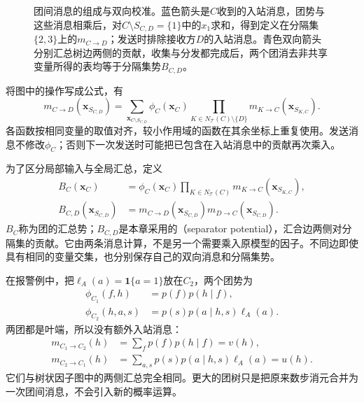 \begin{figure}[htbp]
  \centering
  
  \caption{团间消息的组成与双向校准。蓝色箭头是$C$收到的入站消息，团势与这些消息相乘后，对$C\setminus S_{C,D}=\{1\}$中的$x_1$求和，得到定义在分隔集$\{2,3\}$上的$m_{C\to D}$；发送时排除接收方$D$的入站消息。青色双向箭头分别汇总树边两侧的贡献，收集与分发都完成后，两个团消去非共享变量所得的表均等于分隔集势$B_{C,D}$。}
  \label{fig:pgm-junction-tree-message}
\end{figure}

将图中的操作写成公式，有
\begin{equation}
  m_{C\to D}(\bm{x}_{S_{C,D}})
    =\sum_{\bm{x}_{C\setminus S_{C,D}}}
      \phi_C(\bm{x}_C)
      \prod_{K\in N_{\mathcal{T}}(C)\setminus\{D\}}
        m_{K\to C}(\bm{x}_{S_{K,C}}).
  \label{eq:pgm-junction-tree-clique-message}
\end{equation}
各函数按相同变量的取值对齐，较小作用域的函数在其余坐标上重复使用。发送消息不修改$\phi_C$；否则下一次发送时可能把已包含在入站消息中的贡献再次乘入。

为了区分局部输入与全局汇总，定义
\begin{equation}
  \begin{aligned}
    B_C(\bm{x}_C)
      &=\phi_C(\bm{x}_C)
        \prod_{K\in N_{\mathcal{T}}(C)}
          m_{K\to C}(\bm{x}_{S_{K,C}}),\\
    B_{C,D}(\bm{x}_{S_{C,D}})
      &=m_{C\to D}(\bm{x}_{S_{C,D}})
        m_{D\to C}(\bm{x}_{S_{C,D}}).
  \end{aligned}
  \label{eq:pgm-junction-tree-clique-separator-beliefs}
\end{equation}
$B_C$称为团的汇总势；$B_{C,D}$是本章采用的（separator potential），汇合边两侧对分隔集的贡献。它由两条消息计算，不是另一个需要乘入原模型的因子。不同边即使具有相同的变量交集，也分别保存自己的双向消息和分隔集势。

在报警例中，把$\ell_A(a)=\mathbf{1}\{a=1\}$放在$C_2$，两个团势为
\[
  \begin{aligned}
    \phi_{C_1}(f,h)&=p(f)p(h\mid f),\\
    \phi_{C_2}(h,a,s)&=p(s)p(a\mid h,s)\ell_A(a).
  \end{aligned}
\]
两团都是叶端，所以没有额外入站消息：
\begin{equation}
  \begin{aligned}
    m_{C_1\to C_2}(h)&=\sum_f p(f)p(h\mid f)=v(h),\\
    m_{C_2\to C_1}(h)&=\sum_{a,s}p(s)p(a\mid h,s)\ell_A(a)=u(h).
  \end{aligned}
  \label{eq:pgm-junction-tree-device-clique-messages}
\end{equation}
它们与树状因子图中的两侧汇总完全相同。更大的团树只是把原来数步消元合并为一次团间消息，不会引入新的概率运算。

